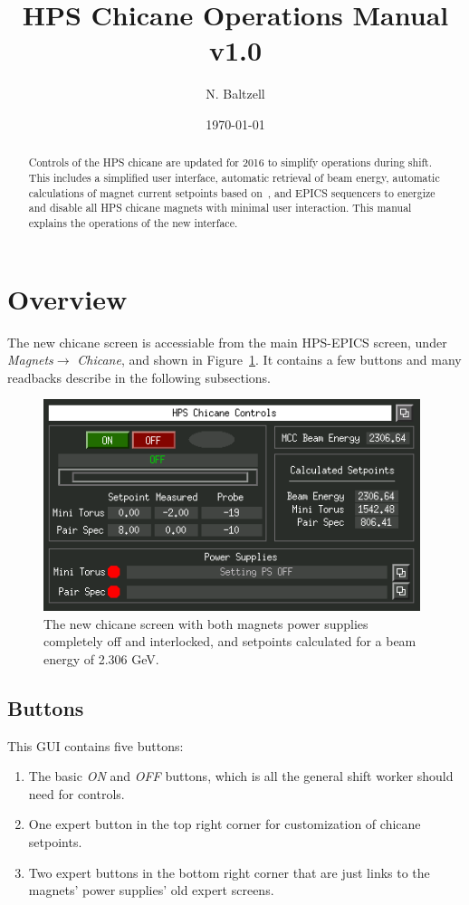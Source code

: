 \documentclass[amsmath,amssymb,notitlepage,12pt]{revtex4-1}
\begin{document}
\title{HPS Chicane Operations Manual v1.0}
\author{N. Baltzell}
\date{\today}
\begin{abstract}
    Controls of the HPS chicane are updated for 2016 to simplify operations during shift.  This includes a simplified user interface, automatic retrieval of beam energy, automatic calculations of magnet current setpoints based on~\cite{chicaneSettings}, and EPICS sequencers to energize and disable all HPS chicane magnets with minimal user interaction.  This manual explains the operations of the new interface. 
\end{abstract}

\maketitle
\tableofcontents
\newpage

\section{Overview}
The new chicane screen is accessiable from the main HPS-EPICS screen, under {\em Magnets}$ \to$ {\em Chicane}, and shown in Figure~\ref{fig:guiChicaneOff}.  It contains a few buttons and many readbacks describe in the following subsections. 
\begin{figure}[htbp]\centering
    \includegraphics[width=11cm]{pics/gui2}
    \caption{The new chicane screen with both magnets power supplies completely off and interlocked, and setpoints calculated for a beam energy of 2.306 GeV.\label{fig:guiChicaneOff}}
\end{figure}
\subsection{Buttons}
This GUI contains five buttons:
\begin{enumerate}
    \item The basic {\em ON} and {\em OFF} buttons, which is all the general shift worker should need for controls.
    \item One expert button in the top right corner for customization of chicane setpoints.
    \item Two expert buttons in the bottom right corner that are just links to the magnets' power supplies' old expert screens.
\end{enumerate}
\end{document}
